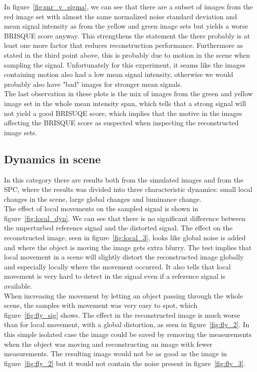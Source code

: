 In figure~\ref{fig:snr_v_sigma}, we can see that there are a subset of images from the red image set with almost the same normalized noise standard deviation and mean signal intensity as from the yellow and green image sets but yields a worse BRISQUE score anyway. This strengthens the statement the there probably is at least one more factor that reduces reconstruction performance. Furthermore as stated in the third point above, this is probably due to motion in the scene when sampling the signal. Unfortunately for this experiment, it seams like the images containing motion also had a low mean signal intensity, otherwise we would probably also have "bad" images for stronger mean signals.\\[0.1in] 

The last observation in these plots is the mix of images from the green and yellow image set in the whole mean intensity span, which tells that a strong signal will not yield a good BRISUQE score, which implies that the motive in the images affecting the BRISQUE score as suspected when inspecting the reconstructed image sets.

\subsection{Dynamics in scene}
In this category there are results both from the simulated images and from the SPC, where the results was divided into three characteristic dynamics: small local changes in the scene, large global changes and luminance change.\\[0.1in]

The effect of local movements on the sampled signal is shown in figure~\ref{fig:local_dyn}. We can see that there is no significant difference between the unperturbed reference signal and the distorted signal. The effect on the reconstructed image, seen in figure~\ref{fig:local_3}, looks like global noise is added and where the object is moving the image gets extra blurry. The test implies that local movement in a scene will slightly distort the reconstructed image globally and especially locally where the movement occurred. It also tells that local movement is very hard to detect in the signal even if a reference signal is available.\\[0.1in]

When increasing the movement by letting an object passing through the whole scene, the samples with movement was very easy to spot, which figure~\ref{fig:fly_sig} shows. The effect in the reconstructed image is much worse than for local movement, with a global distortion, as seen in figure~\ref{fig:fly_2}. In this simple isolated case the image could be saved by removing the measurements when the object was moving and reconstructing an image with fewer measurements. The resulting image would not be as good as the image in figure~\ref{fig:fly_2} but it would not contain the noise present in figure~\ref{fig:fly_3}. \\[0.1in]


